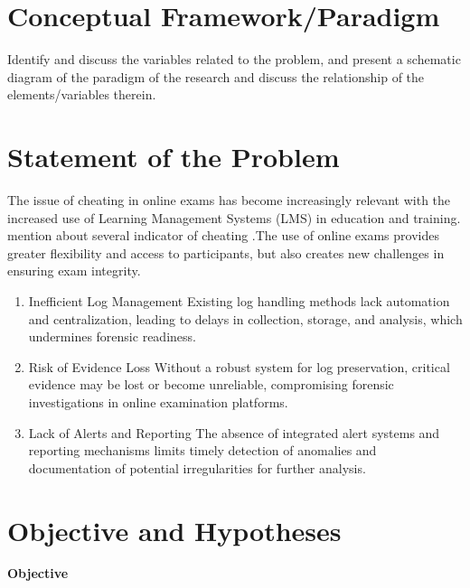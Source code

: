 \section{Conceptual Framework/Paradigm}

Identify and discuss the variables related to the problem, and present a schematic diagram of the paradigm of the research and discuss the relationship of the elements/variables therein.

\section{Statement of the Problem}
The issue of cheating in online exams has become increasingly relevant with the increased use of Learning Management Systems (LMS) in education and training. \citet{ranger2020detection} mention about several indicator of cheating .The use of online exams provides greater flexibility and access to participants, but also creates new challenges in ensuring exam integrity.
 
\begin{enumerate}
    \item Inefficient Log Management Existing log handling methods lack automation and centralization, leading to delays in collection, storage, and analysis, which undermines forensic readiness.
    \item Risk of Evidence Loss Without a robust system for log preservation, critical evidence may be lost or become unreliable, compromising forensic investigations in online examination platforms.
    \item Lack of Alerts and Reporting The absence of integrated alert systems and reporting mechanisms limits timely detection of anomalies and documentation of potential irregularities for further analysis.
\end{enumerate}


\section{Objective and Hypotheses}

\textbf{Objective} 

